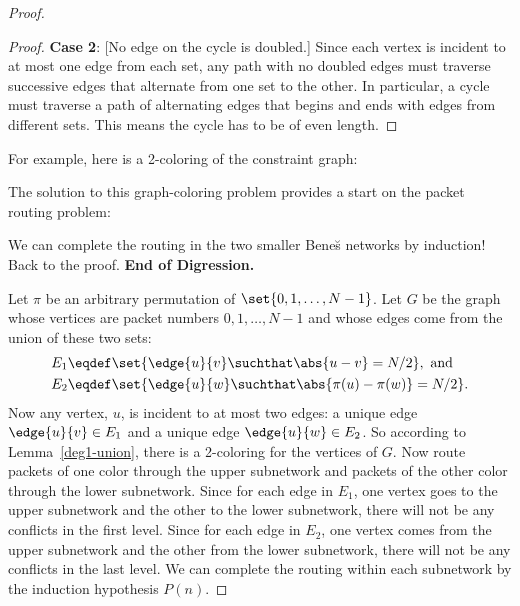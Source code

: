 \begin{proof}
\begin{proof}
  \textbf{Case 2}: [No edge on the cycle is doubled.]  Since each vertex
  is incident to at most one edge from each set, any path with no doubled
  edges must traverse successive edges that alternate from one set to the
  other.  In particular, a cycle must traverse a path of alternating edges
  that begins and ends with edges from different sets.  This means the
  cycle has to be of even length.
\end{proof}

For example, here is a 2-coloring of the constraint graph:

\begin{center}
\end{center}

The solution to this graph-coloring problem provides a start
on the packet routing problem:

We can complete the routing in the two smaller Bene\u{s} networks by
induction!  Back to the proof.  \textbf{End of Digression.}

Let $\pi$ be an arbitrary permutation of $\set{0, 1, \dots, N-1}$.  Let $G$
be the graph whose vertices are packet numbers $0, 1, \dots, N-1$ and whose edges
come from the union of these two sets:
\begin{align*}
E_1 \eqdef &  \set{\edge{u}{v} \suchthat \abs{u - v} = N/2},\ \text{and} \\
E_2 \eqdef &  \set{\edge{u}{w} \suchthat \abs{\pi(u) - \pi(w)} = N/2}.
\end{align*}
Now any vertex, $u$, is incident to at most two edges: a unique edge
$\edge{u}{v} \in E_1$ and a unique edge $\edge{u}{w} \in E_2$.  So
according to Lemma~\ref{deg1-union}, there is a 2-coloring for the
vertices of $G$.  Now route packets of one color through the upper
subnetwork and packets of the other color through the lower subnetwork.
Since for each edge in $E_1$, one vertex goes to the upper subnetwork and
the other to the lower subnetwork, there will not be any conflicts in the
first level.  Since for each edge in $E_2$, one vertex comes from the
upper subnetwork and the other from the lower subnetwork, there will not
be any conflicts in the last level.  We can complete the routing within
each subnetwork by the induction hypothesis $P(n)$.
\end{proof}

\begin{problems}
\examproblems
{}

\classproblems
{}

\homeworkproblems
{}
\end{problems}

\iffalse
In class, you will work through an example in which you route packets
using this recursive idea!
\fi

\endinput

